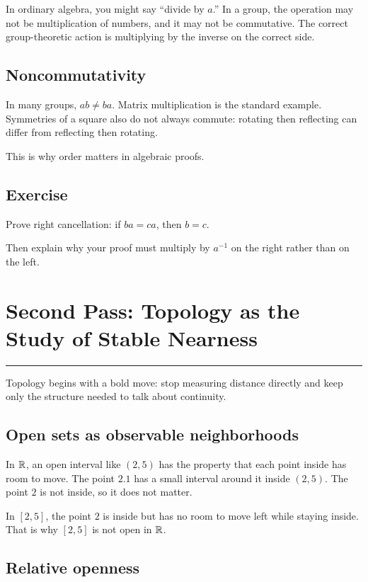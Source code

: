 \documentclass[12pt]{article}
\newcommand{\chapterline}{\vspace{0.4em}\hrule\vspace{0.8em}}
\begin{document}
In ordinary algebra, you might say ``divide by $a$.'' In a group, the operation may not be multiplication of numbers, and it may not be commutative. The correct group-theoretic action is multiplying by the inverse on the correct side.

\subsection{Noncommutativity}

In many groups, $ab\neq ba$. Matrix multiplication is the standard example. Symmetries of a square also do not always commute: rotating then reflecting can differ from reflecting then rotating.

This is why order matters in algebraic proofs.

\subsection{Exercise}

Prove right cancellation: if $ba=ca$, then $b=c$.

Then explain why your proof must multiply by $a^{-1}$ on the right rather than on the left.

\newpage
\section{Second Pass: Topology as the Study of Stable Nearness}
\chapterline

Topology begins with a bold move: stop measuring distance directly and keep only the structure needed to talk about continuity.

\subsection{Open sets as observable neighborhoods}

In $\mathbb{R}$, an open interval like $(2,5)$ has the property that each point inside has room to move. The point $2.1$ has a small interval around it inside $(2,5)$. The point $2$ is not inside, so it does not matter.

In $[2,5]$, the point $2$ is inside but has no room to move left while staying inside. That is why $[2,5]$ is not open in $\mathbb{R}$.

\subsection{Relative openness}
\end{document}
